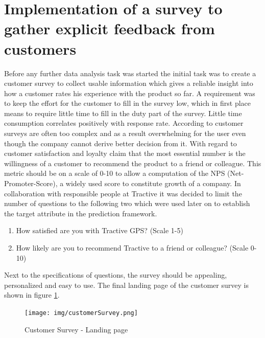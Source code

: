 \section{Implementation of a survey to gather explicit feedback from customers}
Before any further data analysis task was started the initial task was to create a customer survey to collect usable information which gives a reliable insight into how a customer rates his experience with the product so far. A requirement was to keep the effort for the customer to fill in the survey low, which in first place means to require little time to fill in the duty part of the survey. Little time consumption correlates positively with response rate. According to \cite{reichheld2003one} customer surveys are often too complex and as a result overwhelming for the user even though the company cannot derive better decision from it. With regard to customer satisfaction and loyalty \cite{reichheld2003one} claim that the most essential number is the willingness of a customer to recommend the product to a friend or colleague. This metric should be on a scale of 0-10 to allow a computation of the NPS (Net-Promoter-Score), a widely used score to constitute growth of a company. In collaboration with responsible people at Tractive it was decided to limit the number of questions to the following two which were used later on to establish the target attribute in the prediction framework.

\begin{enumerate}
	\item How satisfied are you with Tractive GPS? (Scale 1-5)
	\item How likely are you to recommend Tractive to a friend or colleague? (Scale 0-10)
\end{enumerate}

Next to the specifications of questions, the survey should be appealing, personalized and easy to use. The final landing page of the customer survey is shown in figure \ref{fig:customerSurvey}. 

\begin{figure}
	\centering
	\texttt{[image: img/customerSurvey.png]}
	\caption{Customer Survey - Landing page}
	\label{fig:customerSurvey}
\end{figure} 

